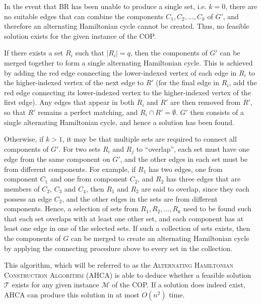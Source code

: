 \documentclass[oribibl]{llncs}
\begin{document}
In the event that BR has been unable to produce a single set, i.e. $k = 0$, there are no suitable edges that can combine the components $C_1, C_2, ..., C_k$ of $G'$, and therefore an alternating Hamiltonian cycle cannot be created. Thus, no feasible solution exists for the given instance of the COP.

If there exists a set $R_i$ such that $|R_i| = q$, then the components of $G'$ can be merged together to form a single alternating Hamiltonian cycle. This is achieved by adding the red edge connecting the lower-indexed vertex of each edge in $R_i$ to the higher-indexed vertex of the next edge to $R'$ (for the final edge in $R_i$, add the red edge connecting its lower-indexed vertex to the higher-indexed vertex of the first edge). Any edges that appear in both $R_i$ and $R'$ are then removed from $R'$, so that $R'$ remains a perfect matching, and $R_i \cap R' = \emptyset$. $G'$ then consists of a single alternating Hamiltonian cycle, and hence a solution has been found.

Otherwise, if $k > 1$, it may be that multiple sets are required to connect all components of $G'$. For two sets $R_i$ and $R_j$ to ``overlap'', each set must have one edge from the same component on $G'$, and the other edges in each set must be from different components. For example, if $R_1$ has two edges, one from component $C_1$ and one from component $C_2$, and $R_2$ has three edges that are members of $C_2$, $C_3$ and $C_4$, then $R_1$ and $R_2$ are said to overlap, since they each possess an edge $C_2$, and the other edges in the sets are from different components. Hence, a selection of sets from $R_1, R_2, ..., R_k$ need to be found such that each set overlaps with at least one other set, and each component has at least one edge in one of the selected sets. If such a collection of sets exists, then the components of $G$ can be merged to create an alternating Hamiltonian cycle by applying the connecting procedure above to every set in the collection.

This algorithm, which will be referred to as the \textsc{Alternating Hamiltonian Construction Algorithm} (AHCA) is able to deduce whether a feasible solution $\mathcal{T}$ exists for any given instance $\mathcal{M}$ of the COP. If a solution does indeed exist, AHCA can produce this solution in at most $O(n^2)$ time.
\end{document}
